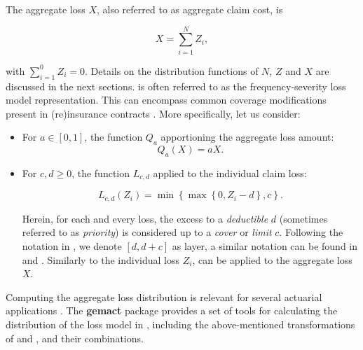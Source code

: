 \documentclass{article}
\begin{document}
The aggregate loss $X$, also referred to as aggregate claim cost, is

\begin{equation}
\label{eq:lossmodel}
X=\sum_{i=1}^{N} Z_i,
\end{equation}

with $\sum_{i=1}^{0} Z_i=0$. Details on the distribution functions of $N$, $Z$ and $X$ are discussed in the next sections.
 is often referred to as the frequency-severity loss model representation. This can encompass common coverage modifications present in (re)insurance contracts \cite[p.~50]{parodi14}. More specifically, let us consider:

\begin{itemize}

    \item For $a \in [0, 1]$, the function $Q_a$ apportioning  the aggregate loss amount: 
    \begin{equation}
        \label{eq:qs}
       Q_a (X)= a X.
    \end{equation}
    
    \item  For $c,d \geq 0$, the function $L_{c, d}$ applied to the individual claim loss: 
    
     \begin{equation}
         \label{eq:xl}
             L_{c, d} (Z_i) = \min \left\{\max \left\{0, Z_i-d\right\}, c\right\}. %
         \end{equation}
    
    Herein, for each and every loss, the excess to a \textit{deductible} $d$ (sometimes referred to as \textit{priority}) is considered up to a \textit{cover} or \textit{limit} $c$. Following the notation in \cite[p.~34]{albrecher17}, we denote $ [d, d+c ]$ as layer, a similar notation can be found in \cite{ladoucette06} and \cite[p.~46]{parodi14}. Similarly to the individual loss $Z_i$,  can be applied to the aggregate loss $X$.

  
    
\end{itemize}

Computing the aggregate loss distribution is relevant for several actuarial applications \cite[p.~93]{parodi14}. The \textbf{gemact} package provides a set of tools for calculating the distribution of the loss model in , including the above-mentioned transformations of  and , and their combinations. 
\end{document}
